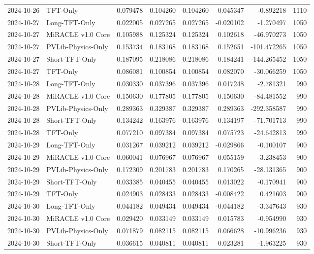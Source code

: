 \begin{tabular}{llrrrrrr}
2024-10-26 & TFT-Only & 0.079478 & 0.104260 & 0.104260 & 0.045347 & -0.892218 & 1110 \\
2024-10-27 & Long-TFT-Only & 0.022005 & 0.027265 & 0.027265 & -0.020102 & -1.270497 & 1050 \\
2024-10-27 & MiRACLE v1.0 Core & 0.105988 & 0.125324 & 0.125324 & 0.102618 & -46.970273 & 1050 \\
2024-10-27 & PVLib-Physics-Only & 0.153734 & 0.183168 & 0.183168 & 0.152651 & -101.472265 & 1050 \\
2024-10-27 & Short-TFT-Only & 0.187095 & 0.218086 & 0.218086 & 0.184241 & -144.265452 & 1050 \\
2024-10-27 & TFT-Only & 0.086081 & 0.100854 & 0.100854 & 0.082070 & -30.066259 & 1050 \\
2024-10-28 & Long-TFT-Only & 0.030330 & 0.037396 & 0.037396 & 0.017248 & -2.781321 & 990 \\
2024-10-28 & MiRACLE v1.0 Core & 0.150630 & 0.177805 & 0.177805 & 0.150630 & -84.481552 & 990 \\
2024-10-28 & PVLib-Physics-Only & 0.289363 & 0.329387 & 0.329387 & 0.289363 & -292.358587 & 990 \\
2024-10-28 & Short-TFT-Only & 0.134242 & 0.163976 & 0.163976 & 0.134197 & -71.701713 & 990 \\
2024-10-28 & TFT-Only & 0.077210 & 0.097384 & 0.097384 & 0.075723 & -24.642813 & 990 \\
2024-10-29 & Long-TFT-Only & 0.031267 & 0.039212 & 0.039212 & -0.029866 & -0.100107 & 900 \\
2024-10-29 & MiRACLE v1.0 Core & 0.060041 & 0.076967 & 0.076967 & 0.055159 & -3.238453 & 900 \\
2024-10-29 & PVLib-Physics-Only & 0.172309 & 0.201783 & 0.201783 & 0.170265 & -28.131365 & 900 \\
2024-10-29 & Short-TFT-Only & 0.033385 & 0.040455 & 0.040455 & 0.013022 & -0.170941 & 900 \\
2024-10-29 & TFT-Only & 0.024903 & 0.028433 & 0.028433 & -0.008422 & 0.421603 & 900 \\
2024-10-30 & Long-TFT-Only & 0.044182 & 0.049434 & 0.049434 & -0.044182 & -3.347643 & 930 \\
2024-10-30 & MiRACLE v1.0 Core & 0.029420 & 0.033149 & 0.033149 & 0.015783 & -0.954990 & 930 \\
2024-10-30 & PVLib-Physics-Only & 0.071879 & 0.082115 & 0.082115 & 0.066628 & -10.996236 & 930 \\
2024-10-30 & Short-TFT-Only & 0.036615 & 0.040811 & 0.040811 & 0.023281 & -1.963225 & 930 \\

\end{tabular}
